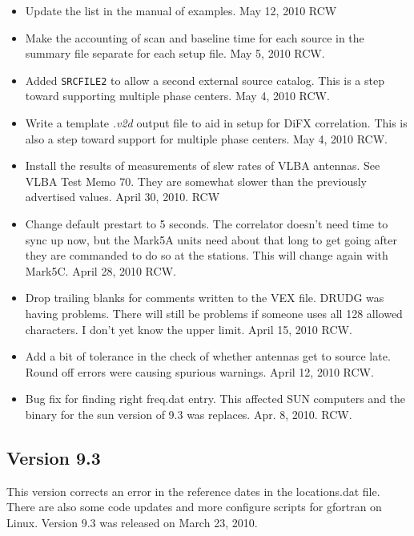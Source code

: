 \documentclass{report}
\begin{document}
\begin{itemize}
\item Update the list in the manual of examples.  May 12, 2010  RCW

\item Make the accounting of scan and baseline time for each
source in the summary file separate for each setup file.
May 5, 2010  RCW.

\item Added {\tt SRCFILE2} to allow a second external source
catalog. This is a step toward supporting multiple phase centers.
May 4, 2010  RCW.

\item Write a template {\sl .v2d} output file to aid in setup for DiFX
correlation.  This is also a step toward support for multiple phase
centers.  May 4, 2010 RCW.

\item  Install the results of measurements of slew rates of VLBA
antennas.  See VLBA Test Memo 70.  They are somewhat slower than
the previously advertised values.  April 30, 2010. RCW

\item  Change default prestart to 5 seconds.  The correlator doesn't
need time to sync up now, but the Mark5A units need about that long
to get going after they are commanded to do so at the stations.  This
will change again with Mark5C.  April 28, 2010  RCW.

\item  Drop trailing blanks for comments written to the VEX file.
DRUDG was having problems.  There will still be problems if someone
uses all 128 allowed characters.  I don't yet know the upper limit.
April 15, 2010  RCW.

\item  Add a bit of tolerance in the check of whether antennas get
to source late.  Round off errors were causing spurious warnings.
April 12, 2010  RCW.

\item  Bug fix for finding right freq.dat entry.  This affected SUN
computers and the binary for the sun version of 9.3 was replaces.
Apr. 8, 2010.  RCW.

\end{itemize}

\subsection{\label{SSEC:VER_9.3}Version 9.3}

This version corrects an error in the reference dates in the
locations.dat file.  There are also some code updates and more
configure scripts for gfortran on Linux.
Version 9.3 was released on March 23, 2010.
\end{document}
